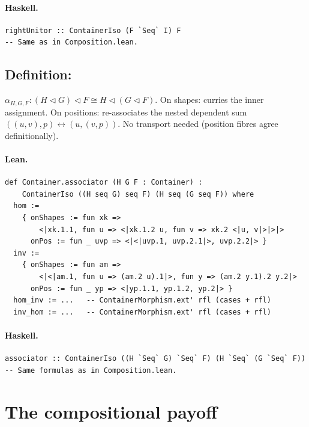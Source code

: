 \documentclass[11pt,a4paper]{article}
\begin{document}
\paragraph{Haskell.}
\begin{lstlisting}[style=haskell]
rightUnitor :: ContainerIso (F `Seq` I) F
-- Same as in Composition.lean.
\end{lstlisting}


\subsection{Definition: }

\begin{defn}[Associator]
$\alpha_{H,G,F} : (H \triangleleft G) \triangleleft F \cong H \triangleleft (G \triangleleft F)$.
On shapes: curries the inner assignment.  On positions: re-associates the
nested dependent sum $((u, v), p) \leftrightarrow (u, (v, p))$.  No transport
needed (position fibres agree definitionally).
\end{defn}

\paragraph{Lean.}
\begin{lstlisting}[style=lean]
def Container.associator (H G F : Container) :
    ContainerIso ((H seq G) seq F) (H seq (G seq F)) where
  hom :=
    { onShapes := fun xk =>
        <|xk.1.1, fun u => <|xk.1.2 u, fun v => xk.2 <|u, v|>|>|>
      onPos := fun _ uvp => <|<|uvp.1, uvp.2.1|>, uvp.2.2|> }
  inv :=
    { onShapes := fun am =>
        <|<|am.1, fun u => (am.2 u).1|>, fun y => (am.2 y.1).2 y.2|>
      onPos := fun _ yp => <|yp.1.1, yp.1.2, yp.2|> }
  hom_inv := ...   -- ContainerMorphism.ext' rfl (cases + rfl)
  inv_hom := ...   -- ContainerMorphism.ext' rfl (cases + rfl)
\end{lstlisting}

\paragraph{Haskell.}
\begin{lstlisting}[style=haskell]
associator :: ContainerIso ((H `Seq` G) `Seq` F) (H `Seq` (G `Seq` F))
-- Same formulas as in Composition.lean.
\end{lstlisting}

\section{The compositional payoff}
\end{document}
